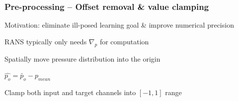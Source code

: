 \begin{frame}
    \frametitle{Pre-processing -- Offset removal \& value clamping}
\vspace*{0.8cm}
Motivation: eliminate ill-posed learning goal \& improve numerical precision

\begin{PraesentationAufzaehlung}
\item RANS typically only needs $\nabla_{p}$ for computation
\item Spatially move pressure distribution into the origin
\item $\hat{p_o} = \tilde{p_o} - p_{mean}$ 
\item Clamp both input and target channels into $[-1, 1]$ range
\end{PraesentationAufzaehlung}
\end{frame}
\clearpage
